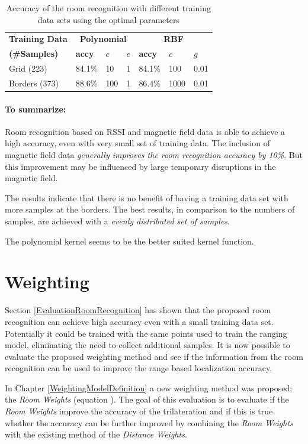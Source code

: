 \begin{table}
\centering
\begin{tabular}{l l l l l l l}
\toprule
\textbf{Training Data}&\multicolumn{3}{c}{\textbf{Polynomial}}&\multicolumn{3}{c}{\textbf{RBF}}\\
\textbf{(\#Samples)}&\textbf{accy}&$c$&$e$&\textbf{accy}&$c$&$g$\\
\midrule
Grid (223)&84.1\%&10&1&84.1\%&100&0.01\\
Borders (373)&88.6\%&100&1&86.4\%&1000&0.01\\
\bottomrule
\end{tabular}
\caption[Room Recognition - optimized parameters]{Accuracy of the room recognition with different training data sets using the optimal parameters}
\label{tab:SVMconfigurationPoly}
\end{table}

\paragraph{To summarize:} Room recognition based on RSSI and magnetic field data is able to achieve a high accuracy, even with very small set of training data. The inclusion of magnetic field data \emph{generally improves the room recognition accuracy by 10\%}. But this improvement may be influenced by large temporary disruptions in the magnetic field.

The results indicate that there is no benefit of having a training data set with more samples at the borders. The best results, in comparison to the numbers of samples, are achieved with a \emph{evenly distributed set of samples}. 
 
The polynomial kernel seems to be the better suited kernel function.

\section{Weighting}
\label{EvaluationWeighting}

Section \ref{EvaluationRoomRecognition} has shown that the proposed room recognition can achieve high accuracy even with a small training data set. Potentially it could be trained with the same points used to train the ranging model, eliminating the need to collect additional samples. It is now possible to evaluate the proposed weighting method and see if the information from the room recognition can be used to improve the range based localization accuracy.

In Chapter \ref{WeightingModelDefinition} a new weighting method was proposed; the \emph{Room Weights} (equation ). The goal of this evaluation is to evaluate if the \emph{Room Weights} improve the accuracy of the trilateration and if this is true whether the accuracy can be further improved by combining the \emph{Room Weights} with the existing method of the \emph{Distance Weights}.

